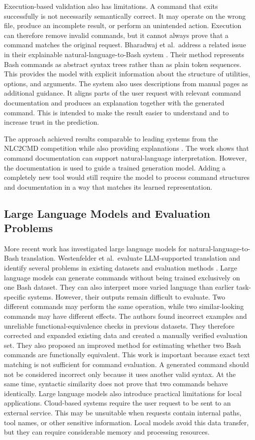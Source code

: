 Execution-based validation also has limitations. A command that exits successfully is not necessarily semantically correct. It may operate on the wrong file, produce an incomplete result, or perform an unintended action. Execution can therefore remove invalid commands, but it cannot always prove that a command matches the original request. Bharadwaj et al.\ address a related issue in their explainable natural-language-to-Bash system \cite{bharadwaj2021explainable}. Their method represents Bash commands as abstract syntax trees rather than as plain token sequences. This provides the model with explicit information about the structure of utilities, options, and arguments. The system also uses descriptions from manual pages as additional guidance. It aligns parts of the user request with relevant command documentation and produces an explanation together with the generated command. This is intended to make the result easier to understand and to increase trust in the prediction.

The approach achieved results comparable to leading systems from the NLC2CMD competition while also providing explanations \cite{bharadwaj2021explainable}. The work shows that command documentation can support natural-language interpretation. However, the documentation is used to guide a trained generation model. Adding a completely new tool would still require the model to process command structures and documentation in a way that matches its learned representation.

\subsection{Large Language Models and Evaluation Problems}
More recent work has investigated large language models for natural-language-to-Bash translation. Westenfelder et al.\ evaluate LLM-supported translation and identify several problems in existing datasets and evaluation methods \cite{westenfelder2025llm}.
Large language models can generate commands without being trained exclusively on one Bash dataset. They can also interpret more varied language than earlier task-specific systems. However, their outputs remain difficult to evaluate. Two different commands may perform the same operation, while two similar-looking commands may have different effects.
The authors found incorrect examples and unreliable functional-equivalence checks in previous datasets. They therefore corrected and expanded existing data and created a manually verified evaluation set. They also proposed an improved method for estimating whether two Bash commands are functionally equivalent. This work is important because exact text matching is not sufficient for command evaluation. A generated command should not be considered incorrect only because it uses another valid syntax. At the same time, syntactic similarity does not prove that two commands behave identically.
Large language models also introduce practical limitations for local applications. Cloud-based systems require the user request to be sent to an external service. This may be unsuitable when requests contain internal paths, tool names, or other sensitive information. Local models avoid this data transfer, but they can require considerable memory and processing resources.


